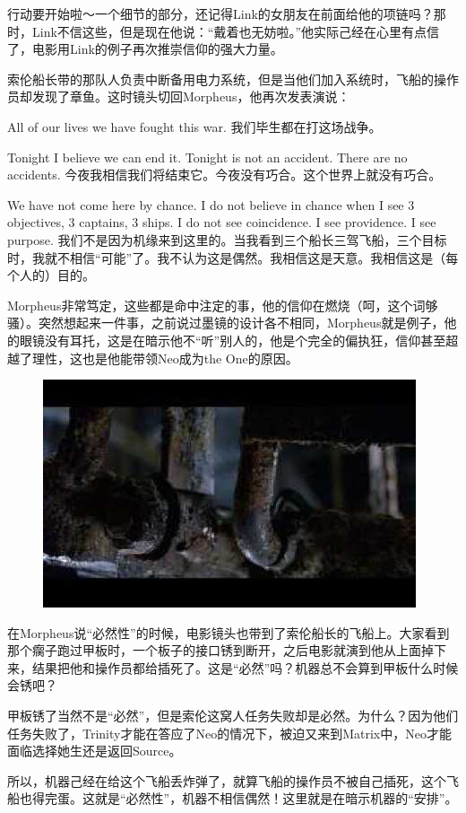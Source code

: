 \documentclass{ctexart}
\begin{document}
行动要开始啦～一个细节的部分，还记得Link的女朋友在前面给他的项链吗？那时，Link不信这些，但是现在他说：“戴着也无妨啦。”他实际己经在心里有点信了，电影用Link的例子再次推崇信仰的强大力量。

索伦船长带的那队人负责中断备用电力系统，但是当他们加入系统时，飞船的操作员却发现了章鱼。这时镜头切回Morpheus，他再次发表演说：

All of our lives we have fought this war. 我们毕生都在打这场战争。

Tonight I believe we can end it. Tonight is not an accident. There are no accidents. 今夜我相信我们将结束它。今夜没有巧合。这个世界上就没有巧合。

We have not come here by chance. I do not believe in chance when I see 3 objectives, 3 captains, 3 ships. I do not see coincidence. I see providence. I see purpose. 我们不是因为机缘来到这里的。当我看到三个船长三驾飞船，三个目标时，我就不相信“可能”了。我不认为这是偶然。我相信这是天意。我相信这是（每个人的）目的。

Morpheus非常笃定，这些都是命中注定的事，他的信仰在燃烧（呵，这个词够骚）。突然想起来一件事，之前说过墨镜的设计各不相同，Morpheus就是例子，他的眼镜没有耳托，这是在暗示他不“听”别人的，他是个完全的偏执狂，信仰甚至超越了理性，这也是他能带领Neo成为the One的原因。

\begin{figure}[htb]
\centering
\includegraphics[width=0.5\linewidth]{fig/read_reloaded-148}
\end{figure}

在Morpheus说“必然性”的时候，电影镜头也带到了索伦船长的飞船上。大家看到那个瘸子跑过甲板时，一个板子的接口锈到断开，之后电影就演到他从上面掉下来，结果把他和操作员都给插死了。这是“必然”吗？机器总不会算到甲板什么时候会锈吧？

甲板锈了当然不是“必然”，但是索伦这窝人任务失败却是必然。为什么？因为他们任务失败了，Trinity才能在答应了Neo的情况下，被迫又来到Matrix中，Neo才能面临选择她生还是返回Source。

所以，机器己经在给这个飞船丢炸弹了，就算飞船的操作员不被自己插死，这个飞船也得完蛋。这就是“必然性”，机器不相信偶然！这里就是在暗示机器的“安排”。
\end{document}
